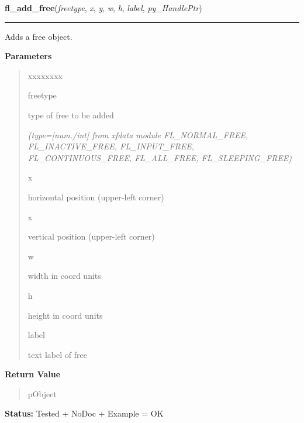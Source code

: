\hspace{.8\funcindent}\begin{boxedminipage}{\funcwidth}

    \raggedright \textbf{fl\_add\_free}(\textit{freetype}, \textit{x}, \textit{y}, \textit{w}, \textit{h}, \textit{label}, \textit{py\_HandlePtr})

    \vspace{-1.5ex}

    \rule{\textwidth}{0.5\fboxrule}
\setlength{\parskip}{2ex}
    Adds a free object.

\setlength{\parskip}{1ex}
      \textbf{Parameters}
      \vspace{-1ex}

      \begin{quote}
        \begin{Ventry}{xxxxxxxx}

          \item[freetype]

          type of free to be added

            {\it (type=[num./int] from xfdata module FL\_NORMAL\_FREE, FL\_INACTIVE\_FREE, 
FL\_INPUT\_FREE, FL\_CONTINUOUS\_FREE, FL\_ALL\_FREE, FL\_SLEEPING\_FREE)}

          \item[x]

          horizontal position (upper-left corner)

          \item[x]

          vertical position (upper-left corner)

          \item[w]

          width in coord units

          \item[h]

          height in coord units

          \item[label]

          text label of free

        \end{Ventry}

      \end{quote}

      \textbf{Return Value}
    \vspace{-1ex}

      \begin{quote}
      pObject

      \end{quote}

\textbf{Status:} Tested + NoDoc + Example = OK



    \end{boxedminipage}

